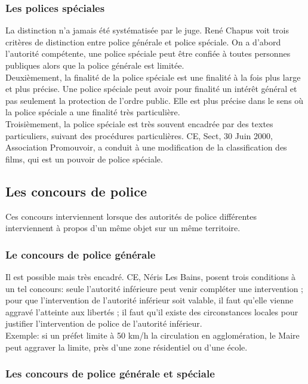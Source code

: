 \documentclass[10pt, a4paper, openany]{book}
\begin{document}
\subsubsection{Les polices spéciales}

La distinction n'a jamais été systématisée par le juge. René Chapus voit trois critères de distinction entre police générale et police spéciale. On a d'abord l'autorité compétente, une police spéciale peut être confiée à toutes personnes publiques alors que la police générale est limitée. \\
Deuxièmement, la finalité de la police spéciale est une finalité à la fois plus large et plus précise. Une police spéciale peut avoir pour finalité un intérêt général et pas seulement la protection de l'ordre public. Elle est plus précise dans le sens où la police spéciale a une finalité très particulière. \\
Troisièmement, la police spéciale est très souvent encadrée par des textes particuliers, suivant des procédures particulières. CE, Sect, 30 Juin 2000, Association Promouvoir, a conduit à une modification de la classification des films, qui est un pouvoir de police spéciale. 

\subsection{Les concours de police}

Ces concours interviennent lorsque des autorités de police différentes interviennent à propos d'un même objet sur un même territoire. 

\subsubsection{Le concours de police générale}

Il est possible mais très encadré. CE, Néris Les Bains, posent trois conditions à un tel concours: seule l'autorité inférieure peut venir compléter une intervention ; pour que l'intervention de l'autorité inférieur soit valable, il faut qu'elle vienne aggravé l'atteinte aux libertés ; il faut qu'il existe des circonstances locales pour justifier l'intervention de police de l'autorité inférieur. \\
Exemple: si un préfet limite à 50 km/h la circulation en agglomération, le Maire peut aggraver la limite, près d'une zone résidentiel ou d'une école. 

\subsubsection{Les concours de police générale et spéciale}
\end{document}

